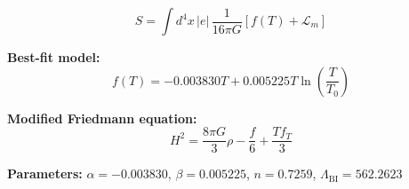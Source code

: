 
\begin{equation}
  S = \int d^4x \, |e| \, \frac{1}{16\pi G} \left[ f(T) + \mathcal{L}_m \right]
\end{equation}

\textbf{Best-fit model:}
\begin{equation}
  f(T) = -0.003830 T + 0.005225 T \ln\!\left(\frac{T}{T_0}\right)
\end{equation}

\textbf{Modified Friedmann equation:}
\begin{equation}
  H^2 = \frac{8\pi G}{3} \rho - \frac{f}{6} + \frac{T f_T}{3}
\end{equation}

\textbf{Parameters:}
$\alpha = -0.003830$, \quad
$\beta = 0.005225$, \quad
$n = 0.7259$, \quad
$\Lambda_{\text{BI}} = 562.2623$
